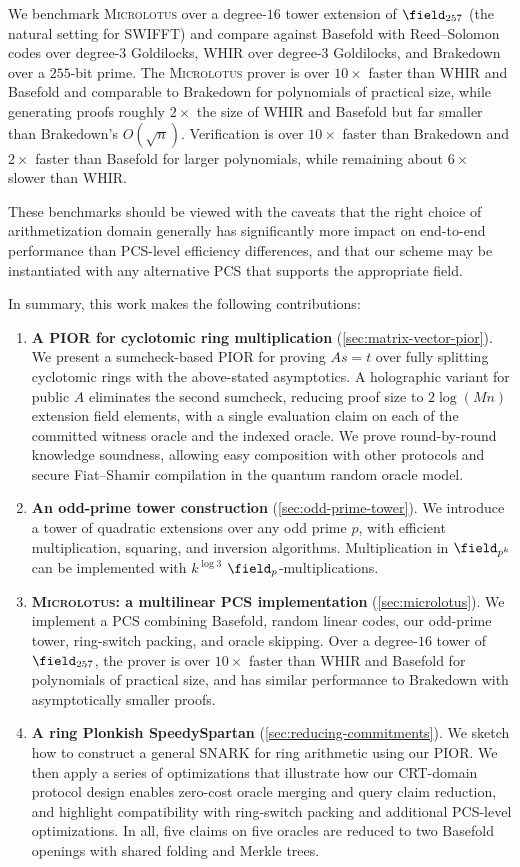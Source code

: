 We benchmark \textsc{Microlotus} over a degree-$16$ tower extension of $\field_{257}$ (the natural setting for SWIFFT) and compare against Basefold with Reed--Solomon codes over degree-$3$ Goldilocks, WHIR over degree-$3$ Goldilocks, and Brakedown over a $255$-bit prime. The \textsc{Microlotus} prover is over $10\times$ faster than WHIR and Basefold and comparable to Brakedown for polynomials of practical size, while generating proofs roughly $2\times$ the size of WHIR and Basefold but far smaller than Brakedown's $O(\sqrt{n})$. Verification is over $10\times$ faster than Brakedown and $2\times$ faster than Basefold for larger polynomials, while remaining about $6\times$ slower than WHIR. 

These benchmarks should be viewed with the caveats that the right choice of arithmetization domain generally has significantly more impact on end-to-end performance than PCS-level efficiency differences, and that our scheme may be instantiated with any alternative PCS that supports the appropriate field.

In summary, this work makes the following contributions:
\begin{enumerate}[nosep]
    \item \textbf{A PIOR for cyclotomic ring multiplication} (\cref{sec:matrix-vector-pior}). We present a sumcheck-based PIOR for proving $As = t$ over fully splitting cyclotomic rings with the above-stated asymptotics. A holographic variant for public $A$ eliminates the second sumcheck, reducing proof size to $2\log(Mn)$ extension field elements, with a single evaluation claim on each of the committed witness oracle and the indexed oracle. We prove round-by-round knowledge soundness, allowing easy composition with other protocols and secure Fiat--Shamir compilation in the quantum random oracle model.
    \item \textbf{An odd-prime tower construction} (\cref{sec:odd-prime-tower}). We introduce a tower of quadratic extensions over any odd prime $p$, with efficient multiplication, squaring, and inversion algorithms. Multiplication in $\field_{p^k}$ can be implemented with $k^{\log 3}$ $\field_p$-multiplications.
    \item \textbf{\textsc{Microlotus}: a multilinear PCS implementation} (\cref{sec:microlotus}). We implement a PCS combining Basefold, random linear codes, our odd-prime tower, ring-switch packing, and oracle skipping. Over a degree-$16$ tower of $\field_{257}$, the prover is over $10\times$ faster than WHIR and Basefold for polynomials of practical size, and has similar performance to Brakedown with asymptotically smaller proofs.
    \item \textbf{A ring Plonkish SpeedySpartan} (\cref{sec:reducing-commitments}). We sketch how to construct a general SNARK for ring arithmetic using our PIOR. We then apply a series of optimizations that illustrate how our CRT-domain protocol design enables zero-cost oracle merging and query claim reduction, and highlight compatibility with ring-switch packing and additional PCS-level optimizations. In all, five claims on five oracles are reduced to two Basefold openings with shared folding and Merkle trees.
\end{enumerate}

